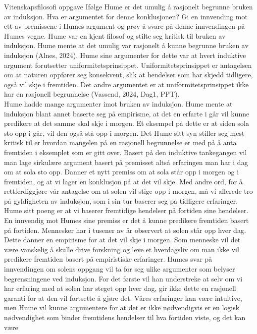 \documentclass[
  letterpaper,
  DIV=11,
  numbers=noendperiod]{scrreprt}
\begin{document}
Vitenskapsfilosofi oppgave Ifølge Hume er det umulig å rasjonelt
begrunne bruken av induksjon. Hva er argumentet for denne konklusjonen?
Gi en innvending mot ett av premissene i Humes argument og prøv å svare
på denne innvendingen på Humes vegne. Hume var en kjent filosof og
stilte seg kritisk til bruken av induksjon. Hume mente at det umulig var
rasjonelt å kunne begrunne bruken av induksjon (Alnes, 2024). Hume sine
argumenter for dette var at hvert induktive argument forutsetter
uniformitetsprinsippet. Uniformitetsprinsippet er antagelsen om at
naturen oppfører seg konsekvent, slik at hendelser som har skjedd
tidligere, også vil skje i fremtiden. Det andre argumentet er at
uniformitetsprinsippet ikke har en rasjonell begrunnelse (Vassend, 2024,
Dag1, PPT).\\
Hume hadde mange argumenter imot bruken av induksjon. Hume mente at
induksjon blant annet baserte seg på empirisme, at det en erfarte i går
vil kunne predikere at det samme skal skje i morgen. Et eksempel på
dette er at siden sola sto opp i går, vil den også stå opp i morgen. Det
Hume sitt syn stiller seg mest kritisk til er hvordan mangelen på en
rasjonell begrunnelse er med på å anta fremtiden i eksemplet som er gitt
over. Basert på den induktive tankegangen vil man lage sirkulære
argument basert på premisset altså erfaringen man har i dag om at sola
sto opp. Danner et nytt premiss om at sola står opp i morgen og i
fremtiden, og at vi lager en konklusjon på at det vil skje. Med andre
ord, for å rettferdiggjøre vår antagelse om at solen vil stige opp i
morgen, må vi allerede tro på gyldigheten av induksjon, som i sin tur
baserer seg på tidligere erfaringer. Hume sitt poeng er at vi baserer
fremtidige hendelser på fortiden sine hendelser. En innvendig mot Humes
sine premiss er det å kunne predikere fremtiden basert på fortiden.
Mennesker har i tusener av år observert at solen står opp hver dag.
Dette danner en empirisme for at det vil skje i morgen. Som menneske vil
det være vanskelig å skulle drive forskning og leve et hverdagsliv om
man ikke vil predikere fremtiden basert på empiristiske erfaringer.
Humes svar på innvendingen om solens oppgang vil ta for seg ulike
argumenter som belyser begrensningene ved induksjon. For det første vil
han understreke at selv om vi har erfaring med at solen har steget opp
hver dag, gir ikke dette en rasjonell garanti for at den vil fortsette å
gjøre det. Våres erfaringer kan være intuitive, men Hume vil kunne
argumentere for at det er ikke nødvendigvis er en logisk nødvendighet
som binder fremtidens hendelser til hva fortiden viste, og det kan være
\end{document}
